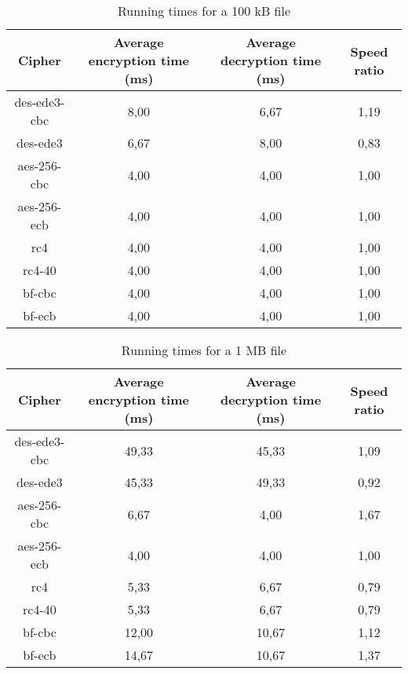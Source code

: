 \documentclass{article}
\begin{document}
\begin{table}
	\centering
	\caption{Running times for a 100 kB file}
	\begin{tabular}[t]{|| c c c c ||}
		\hline
		Cipher & Average encryption time (ms) & Average decryption time (ms) & Speed ratio \\  [0.5ex]
		\hline\hline
		des-ede3-cbc & 8,00 & 6,67 & 1,19        \\
		\hline
		des-ede3     & 6,67 & 8,00 & 0,83        \\
		\hline
		aes-256-cbc & 4,00 & 4,00 & 1,00 \\
		\hline
		aes-256-ecb & 4,00 & 4,00 & 1,00 \\
		\hline
		rc4 & 4,00 & 4,00 & 1,00 \\
		\hline
		rc4-40 & 4,00 & 4,00 & 1,00 \\ 
		\hline
		bf-cbc & 4,00 & 4,00 & 1,00 \\
		\hline
		bf-ecb & 4,00 & 4,00 & 1,00 \\
		\hline
	\end{tabular}
\end{table}

\begin{table}
	\centering
	\caption{Running times for a 1 MB file}
	\begin{tabular}[t]{|| c c c c ||}
		\hline
		Cipher & Average encryption time (ms) & Average decryption time (ms) & Speed ratio \\  [0.5ex]
		\hline\hline
		des-ede3-cbc & 49,33 & 45,33 & 1,09        \\
		\hline
		des-ede3     & 45,33 & 49,33 & 0,92        \\
		\hline
		aes-256-cbc & 6,67  & 4,00 & 1,67 \\
		\hline
		aes-256-ecb & 4,00 & 4,00 & 1,00 \\
		\hline
		rc4 & 5,33 & 6,67 & 0,79 \\
		\hline
		rc4-40 & 5,33 & 6,67 & 0,79 \\ 
		\hline
		bf-cbc & 12,00 & 10,67 & 1,12 \\
		\hline
		bf-ecb & 14,67 & 10,67 & 1,37 \\
		\hline
	\end{tabular}
\end{table}
\end{document}
